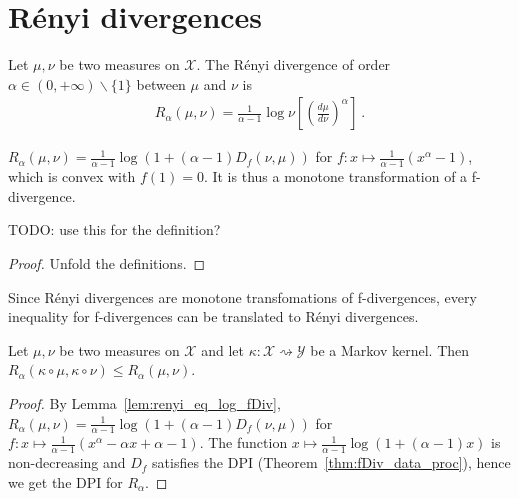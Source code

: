 \chapter{Rényi divergences}

\begin{definition}
  \label{def:Renyi}
  Let $\mu, \nu$ be two measures on $\mathcal X$. The Rényi divergence of order $\alpha \in (0,+\infty) \backslash \{1\}$ between $\mu$ and $\nu$ is
  \begin{align*}
  R_\alpha(\mu, \nu) = \frac{1}{\alpha - 1}\log \nu\left[\left(\frac{d \mu}{d \nu}\right)^\alpha\right] \: .
  \end{align*}
\end{definition}

\begin{lemma}
  \label{lem:renyi_eq_log_fDiv}
  $R_\alpha(\mu, \nu) = \frac{1}{\alpha - 1} \log (1 + (\alpha - 1) D_f(\nu, \mu))$ for $f : x \mapsto \frac{1}{\alpha - 1}(x^{\alpha} - 1)$, which is convex with $f(1)=0$. It is thus a monotone transformation of a f-divergence.

  TODO: use this for the definition?
\end{lemma}

\begin{proof}
Unfold the definitions.
\end{proof}

Since Rényi divergences are monotone transfomations of f-divergences, every inequality for f-divergences can be translated to Rényi divergences.

\begin{theorem}
  \label{thm:renyi_data_proc}
  Let $\mu, \nu$ be two measures on $\mathcal X$ and let $\kappa : \mathcal X \rightsquigarrow \mathcal Y$ be a Markov kernel.
  Then $R_\alpha(\kappa \circ \mu, \kappa \circ \nu) \le R_\alpha(\mu, \nu)$.
\end{theorem}

\begin{proof}
By Lemma~\ref{lem:renyi_eq_log_fDiv}, $R_\alpha(\mu, \nu) = \frac{1}{\alpha - 1} \log (1 + (\alpha - 1) D_f(\nu, \mu))$ for $f : x \mapsto \frac{1}{\alpha - 1}(x^{\alpha} - \alpha x + \alpha - 1)$.
The function $x \mapsto \frac{1}{\alpha - 1}\log (1 + (\alpha - 1)x)$ is non-decreasing and $D_f$ satisfies the DPI (Theorem~\ref{thm:fDiv_data_proc}), hence we get the DPI for $R_\alpha$.
\end{proof}

